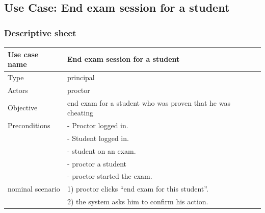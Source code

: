\documentclass[]{uc2pfecaneva}
\begin{document}
    \thispagestyle{empty}
    \begin{table}[h]
        \raggedright\subsection{Use Case: End exam session for a student}
        \subsubsection{Descriptive sheet}
        \centering
        \begin{tabularx}{\textwidth}{|l|X|}
            \hline
            Use case name         & End exam session for a student                                                                                                \\ \hline
            Type                  & principal                                                                                                              \\ \hline
            Actors                & proctor                                                                                                                \\ \hline
            Objective             & end exam for a student who was proven that he was cheating                                                             \\ \hline
            Preconditions
            & - Proctor logged in.                                                                                                   \\
            & - Student logged in.                                                                                                   \\
            & - student on an exam.                                                                                                  \\
            & - proctor a student                                                                                                 \\
            & - proctor started the exam.                                                                                            \\ \hline
            nominal scenario
            & 1) proctor clicks “end exam for this student”.                                                                         \\
            & 2) the system asks him to confirm his action.                                                                          \\

\end{tabularx}
\end{table}
\end{document}
